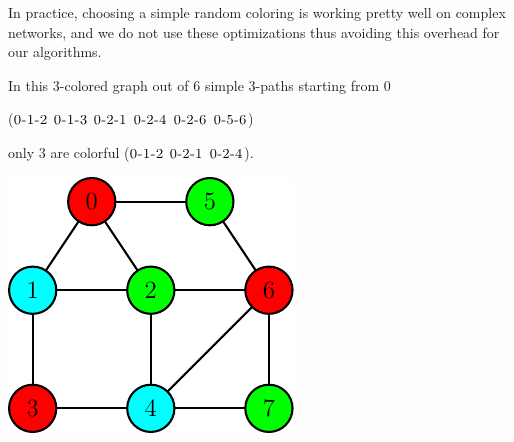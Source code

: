 In practice, choosing a simple random coloring is working pretty well on complex networks, and we do not use these optimizations thus avoiding this overhead for our algorithms.\medskip

\begin{minipage}{0.55\textwidth}\raggedright
	\begin{esempio}
		In this $3$-colored graph out of $6$ simple $3$-paths starting from $0$\medskip
		
		($\textsc{0-1-2}$ $\textsc{0-1-3}$ $\textsc{0-2-1}$ $\textsc{0-2-4}$ $\textsc{0-2-6}$ $\textsc{0-5-6}$)\medskip
		
		only $3$ are colorful ($\textsc{0-1-2}$ $\textsc{0-2-1}$ $\textsc{0-2-4}$).
	\end{esempio}
\end{minipage}
\begin{minipage}{0.35\textwidth}
	\includegraphics[width=\linewidth]{figure/figure-2-6}
\end{minipage}

\noindent

\clearpage